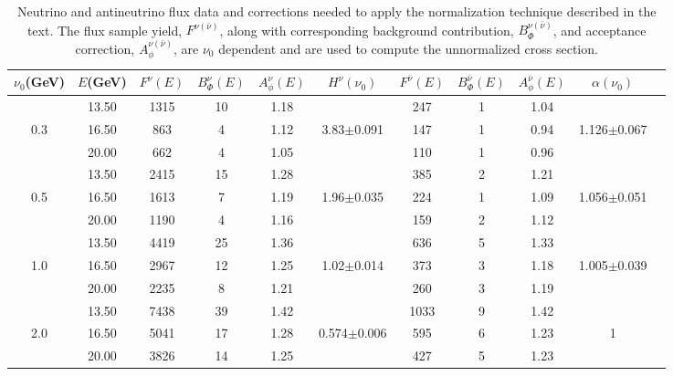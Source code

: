 \documentclass[aps,preprint,showpacs,superscriptaddress,linenumbers,nofootinbib,prd,12pt]{revtex4}
\newcommand{\nunot}{\ensuremath{\nu_0}}
\newcommand{\fsamnu}{\ensuremath{F^{\nu}(E)}}
\newcommand{\bfluxnu}{\ensuremath{B_{\Phi}^{\nu}(E)}}
\newcommand{\fsamnubar}{\ensuremath{F^{\bar{\nu}}(E)}}
\newcommand{\bfluxnubar}{\ensuremath{B_{\Phi}^{\bar{\nu}}(E)}}
\begin{document}
\begin{table}[ht]
\begin{centering}
\begin{tabular}{|c|c|c c c|c|c c c|c|c|}
\hline\hline
$\nunot$(GeV) & $E$(GeV) & $\fsamnu{}$& $\bfluxnu{}$  & $A_{\phi}^{\nu}(E)$& $H^{\nu}(\nunot)$&$\fsamnubar{}$  & $\bfluxnubar{}$& $A_{\phi}^{\bar{\nu}}(E)$& $\alpha(\nunot)$ \\
\hline
&13.50&1315 &10 & 1.18& &247 &1 & 1.04&\\
0.3&16.50&863 &4 & 1.12& 3.83$\pm$0.091&147 &1 & 0.94&1.126$\pm$0.067\\
&20.00&662 &4 & 1.05& &110 &1& 0.96&\\\hline
&13.50&2415 &15 & 1.28& &385 &2 & 1.21&\\
0.5&16.50&1613 &7 & 1.19&1.96$\pm$0.035 &224 &1 & 1.09&1.056$\pm$0.051\\
&20.00&1190 &4 & 1.16& &159 &2 & 1.12&\\\hline
&13.50&4419 &25 & 1.36& &636 &5 & 1.33&\\
1.0&16.50&2967 &12 & 1.25&1.02$\pm$0.014 &373 &3 & 1.18&1.005$\pm$0.039\\
&20.00&2235 &8 & 1.21& &260 &3 & 1.19&\\\hline
&13.50&7438 &39 & 1.42& &1033 &9 & 1.42&\\
2.0&16.50&5041 &17 & 1.28&0.574$\pm$0.006 &595 &6 & 1.23&1\\
&20.00&3826& 14 & 1.25& &427 &5 & 1.23&\\
\hline\hline
\end{tabular}
\caption{Neutrino and antineutrino flux data and corrections 
needed to apply the normalization technique described in the text.  The flux sample yield,  $F^{\nu(\bar{\nu})}$, along with 
corresponding background contribution, $B^{\nu(\bar{\nu})}_{\Phi}$, and acceptance correction, $A^{\nu(\bar{\nu})}_{\phi}$, are $\nunot$ dependent and are used to compute the unnormalized cross section.}
\label{tab:rawdata_nu_nubar_12_22}
\end{centering}
\end{table}
%
\end{document}

